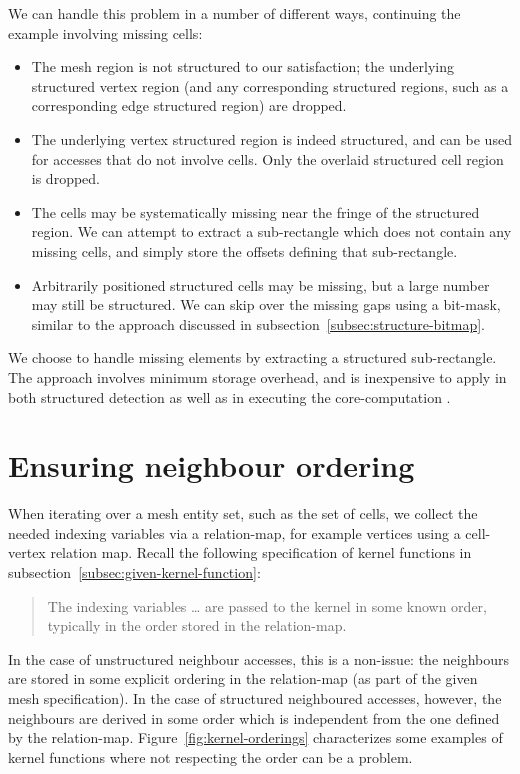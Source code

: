 We can handle this problem in a number of different ways, continuing the example involving missing cells:
\begin{itemize}
\item The mesh region is not structured to our satisfaction; the underlying structured vertex region (and any corresponding structured regions, such as a corresponding edge structured region) are dropped.
\item The underlying vertex structured region is indeed structured, and can be used for accesses that do not involve cells. Only the overlaid structured cell region is dropped.
\item The cells may be systematically missing near the fringe of the structured region. We can attempt to extract a sub-rectangle which does not contain any missing cells, and simply store the offsets defining that sub-rectangle.
\item Arbitrarily positioned structured cells may be missing, but a large number may still be structured. We can skip over the missing gaps using a bit-mask, similar to the approach discussed in subsection~\ref{subsec:structure-bitmap}.
\end{itemize}

We choose to handle missing elements by extracting a structured sub-rectangle. The approach involves minimum storage overhead, and is inexpensive to apply in both structured detection as well as in executing the core-computation .


\section{Ensuring neighbour ordering}
\label{sec:neighbour-ordering-intro}
When iterating over a mesh entity set, such as the set of cells, we collect the needed indexing variables via a relation-map, for example vertices using a cell-vertex relation map. Recall the following specification of kernel functions in subsection~\ref{subsec:given-kernel-function}:
\begin{quote}
The indexing variables \ldots{} are passed to the kernel in some known order, typically in the order stored in the relation-map.
\end{quote}

In the case of unstructured neighbour accesses, this is a non-issue: the neighbours are stored in some explicit ordering in the relation-map (as part of the given mesh specification). In the case of structured neighboured accesses, however, the neighbours are derived in some order which is independent from the one defined by the relation-map. Figure~\ref{fig:kernel-orderings} characterizes some examples of kernel functions where not respecting the order can be a problem.



